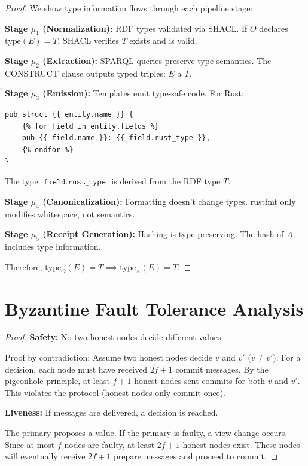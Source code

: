 \begin{proof}
    We show type information flows through each pipeline stage:

    \textbf{Stage \(\mu_1\) (Normalization):} RDF types validated via SHACL. If \(O\) declares \(\text{type}(E) = T\), SHACL verifies \(T\) exists and is valid.

    \textbf{Stage \(\mu_2\) (Extraction):} SPARQL queries preserve type semantics. The CONSTRUCT clause outputs typed triples: \(E\) a \(T\).

    \textbf{Stage \(\mu_3\) (Emission):} Templates emit type-safe code. For Rust:
    \begin{verbatim}
pub struct {{ entity.name }} {
    {% for field in entity.fields %}
    pub {{ field.name }}: {{ field.rust_type }},
    {% endfor %}
}
    \end{verbatim}
    The type \(\texttt{{{ field.rust_type }}}\) is derived from the RDF type \(T\).

    \textbf{Stage \(\mu_4\) (Canonicalization):} Formatting doesn't change types. rustfmt only modifies whitespace, not semantics.

    \textbf{Stage \(\mu_5\) (Receipt Generation):} Hashing is type-preserving. The hash of \(A\) includes type information.

    Therefore, \(\text{type}_O(E) = T \implies \text{type}_A(E) = T\).
\end{proof}

\section{Byzantine Fault Tolerance Analysis}

\begin{theorem}[PBFT Correctness]}
    PBFT guarantees safety and liveness with \(n = 3f + 1\) nodes.
\end{theorem}

\begin{proof}
    \textbf{Safety:} No two honest nodes decide different values.

    Proof by contradiction: Assume two honest nodes decide \(v\) and \(v'\) (\(v \neq v'\)). For a decision, each node must have received \(2f + 1\) commit messages. By the pigeonhole principle, at least \(f + 1\) honest nodes sent commits for both \(v\) and \(v'\). This violates the protocol (honest nodes only commit once).

    \textbf{Liveness:} If messages are delivered, a decision is reached.

    The primary proposes a value. If the primary is faulty, a view change occurs. Since at most \(f\) nodes are faulty, at least \(2f + 1\) honest nodes exist. These nodes will eventually receive \(2f + 1\) prepare messages and proceed to commit.
\end{proof}

